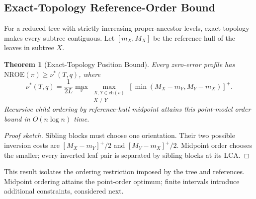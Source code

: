 \documentclass[review]{vgtc}
\newtheorem{theorem}{Theorem}
\newcommand{\nroe}{\mathrm{NROE}}
\begin{document}
\subsection{Exact-Topology Reference-Order Bound}
For a reduced tree with strictly increasing proper-ancestor levels, exact topology makes every subtree contiguous. Let $[m_X,M_X]$ be the reference hull of the leaves in subtree $X$.
\begin{theorem}[Exact-Topology Position Bound]\label{thm:order}
Every zero-error profile has $\nroe(\pi)\ge\nu^*(T,q)$, where
\begin{equation}\label{eq:nu}
 \nu^*(T,q)=\frac{1}{2L}\max_v\max_{\substack{X,Y\in\mathrm{ch}(v)\\X\ne Y}}
 [\min(M_X-m_Y,M_Y-m_X)]^+.
\end{equation}
Recursive child ordering by reference-hull midpoint attains this point-model order bound in $O(n\log n)$ time.
\end{theorem}
\begin{proof}[Proof sketch]
Sibling blocks must choose one orientation. Their two possible inversion costs are $[M_X-m_Y]^+/2$ and $[M_Y-m_X]^+/2$. Midpoint order chooses the smaller; every inverted leaf pair is separated by sibling blocks at its LCA.
\end{proof}
This result isolates the ordering restriction imposed by the tree and references. Midpoint ordering attains the point-order optimum; finite intervals introduce additional constraints, considered next.
\end{document}
